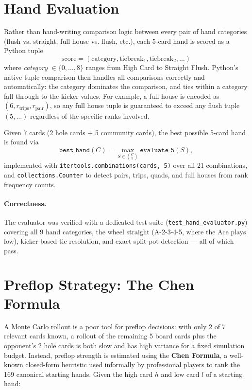 \documentclass[11pt]{article}
\begin{document}
\section{Hand Evaluation}

Rather than hand-writing comparison logic between every pair of hand
categories (flush vs. straight, full house vs. flush, etc.), each 5-card hand
is scored as a Python tuple
\[
    \text{score} = (\text{category}, \text{tiebreak}_1, \text{tiebreak}_2, \dots)
\]
where \emph{category} $\in \{0, \dots, 8\}$ ranges from High Card to Straight
Flush. Python's native tuple comparison then handles all comparisons
correctly and automatically: the category dominates the comparison, and ties
within a category fall through to the kicker values. For example, a full
house is encoded as $(6, r_{\text{trips}}, r_{\text{pair}})$, so any full
house tuple is guaranteed to exceed any flush tuple $(5, \dots)$ regardless of
the specific ranks involved.

Given 7 cards (2 hole cards + 5 community cards), the best possible 5-card
hand is found via
\[
    \texttt{best\_hand}(C) = \max_{S \in \binom{C}{5}} \texttt{evaluate\_5}(S),
\]
implemented with \texttt{itertools.combinations(cards, 5)} over all 21
combinations, and \texttt{collections.Counter} to detect pairs, trips,
quads, and full houses from rank frequency counts.

\paragraph{Correctness.} The evaluator was verified with a dedicated test
suite (\texttt{test\_hand\_evaluator.py}) covering all 9 hand categories, the
wheel straight (A-2-3-4-5, where the Ace plays low), kicker-based tie
resolution, and exact split-pot detection --- all of which pass.

\section{Preflop Strategy: The Chen Formula}

A Monte Carlo rollout is a poor tool for preflop decisions: with only 2 of 7
relevant cards known, a rollout of the remaining 5 board cards plus the
opponent's 2 hole cards is both slow and has high variance for a fixed
simulation budget. Instead, preflop strength is estimated using the
\textbf{Chen Formula}, a well-known closed-form heuristic used informally by
professional players to rank the 169 canonical starting hands. Given the
high card $h$ and low card $l$ of a starting hand:
\end{document}
